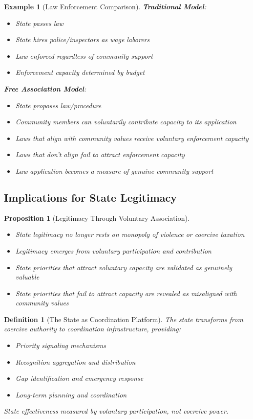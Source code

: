 \documentclass[11pt]{article}
\newtheorem{definition}{Definition}
\newtheorem{proposition}{Proposition}
\newtheorem{example}{Example}
\begin{document}
\begin{example}[Law Enforcement Comparison]
\textbf{Traditional Model}:
\begin{itemize}
\item State passes law
\item State hires police/inspectors as wage laborers
\item Law enforced regardless of community support
\item Enforcement capacity determined by budget
\end{itemize}

\textbf{Free Association Model}:
\begin{itemize}
\item State proposes law/procedure
\item Community members can voluntarily contribute capacity to its application
\item Laws that align with community values receive voluntary enforcement capacity
\item Laws that don't align fail to attract enforcement capacity
\item Law application becomes a measure of genuine community support
\end{itemize}
\end{example}

\subsection{Implications for State Legitimacy}

\begin{proposition}[Legitimacy Through Voluntary Association]
\begin{itemize}
\item State legitimacy no longer rests on monopoly of violence or coercive taxation
\item Legitimacy emerges from voluntary participation and contribution
\item State priorities that attract voluntary capacity are validated as genuinely valuable
\item State priorities that fail to attract capacity are revealed as misaligned with community values
\end{itemize}
\end{proposition}

\begin{definition}[The State as Coordination Platform]
The state transforms from coercive authority to coordination infrastructure, providing:
\begin{itemize}
\item Priority signaling mechanisms
\item Recognition aggregation and distribution
\item Gap identification and emergency response
\item Long-term planning and coordination
\end{itemize}
State effectiveness measured by voluntary participation, not coercive power.
\end{definition}
\end{document}
